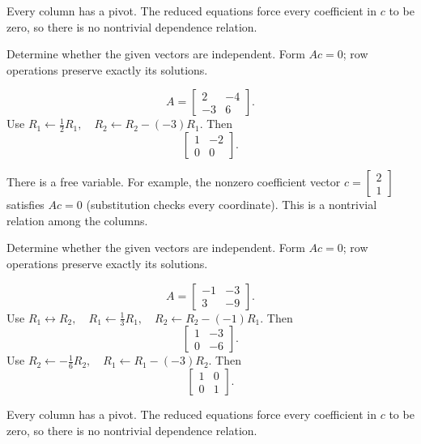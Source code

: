 Every column has a pivot. The reduced equations force every coefficient in $c$ to be zero, so there is no nontrivial dependence relation.



\goal Determine whether the given vectors are independent. Form $Ac=0$; row operations preserve exactly its solutions.

\[ A=\begin{bmatrix}2 & -4\\-3 & 6\end{bmatrix}.\]
Use $R_{1}\leftarrow \frac{1}{2}R_{1},\quad R_{2}\leftarrow R_{2}-(-3)R_{1}$. Then
\[ \begin{bmatrix}1 & -2\\0 & 0\end{bmatrix}.\]

There is a free variable. For example, the nonzero coefficient vector $c=\begin{bmatrix}2\\1\end{bmatrix}$ satisfies $Ac=0$ (substitution checks every coordinate). This is a nontrivial relation among the columns.



\goal Determine whether the given vectors are independent. Form $Ac=0$; row operations preserve exactly its solutions.

\[ A=\begin{bmatrix}-1 & -3\\3 & -9\end{bmatrix}.\]
Use $R_{1}\leftrightarrow R_{2},\quad R_{1}\leftarrow \frac{1}{3}R_{1},\quad R_{2}\leftarrow R_{2}-(-1)R_{1}$. Then
\[ \begin{bmatrix}1 & -3\\0 & -6\end{bmatrix}.\]
Use $R_{2}\leftarrow - \frac{1}{6}R_{2},\quad R_{1}\leftarrow R_{1}-(-3)R_{2}$. Then
\[ \begin{bmatrix}1 & 0\\0 & 1\end{bmatrix}.\]

Every column has a pivot. The reduced equations force every coefficient in $c$ to be zero, so there is no nontrivial dependence relation.



